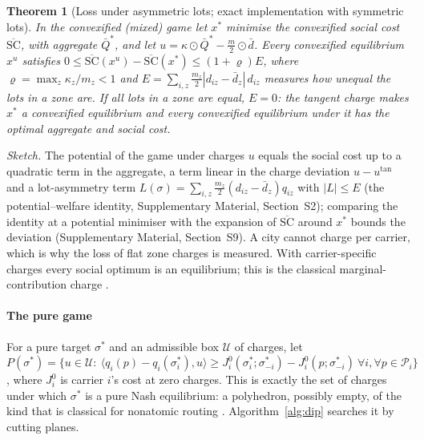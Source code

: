 \documentclass[preprint,11pt]{elsarticle}
\newtheorem{theorem}{Theorem}
\theoremstyle{definition}
\theoremstyle{remark}
\newcommand{\ip}[2]{\langle #1,#2\rangle}
\newcommand{\SM}[1]{Supplementary Material, Section~#1}
\begin{document}
\begin{theorem}[Loss under asymmetric lots; exact implementation with symmetric lots]\label{thm:asym}\label{thm:convex}
In the convexified (mixed) game let $x^*$ minimise the convexified social cost $\overline{\mathrm{SC}}$, with aggregate $\bar Q^*$, and let $u=\kappa\odot\bar Q^*-\tfrac m2\odot\bar d$. Every convexified equilibrium $x^u$ satisfies $0\le\overline{\mathrm{SC}}(x^u)-\overline{\mathrm{SC}}(x^*)\le(1+\varrho)E$, where $\varrho=\max_z\kappa_z/m_z<1$ and $E=\sum_{i,z}\tfrac{m_z}{2}|d_{iz}-\bar d_z|\,d_{iz}$ measures how unequal the lots in a zone are. If all lots in a zone are equal, $E=0$: the tangent charge makes $x^*$ a convexified equilibrium and every convexified equilibrium under it has the optimal aggregate and social cost.
\end{theorem}
\emph{Sketch.} The potential of the game under charges $u$ equals the social cost up to a quadratic term in the aggregate, a term linear in the charge deviation $u-u^{\tan}$ and a lot-asymmetry term $L(\sigma)=\sum_{i,z}\tfrac{m_z}{2}(d_{iz}-\bar d_z)q_{iz}$ with $|L|\le E$ (the potential--welfare identity, \SM{S2}); comparing the identity at a potential minimiser with the expansion of $\overline{\mathrm{SC}}$ around $x^*$ bounds the deviation (\SM{S9}). A city cannot charge per carrier, which is why the loss of flat zone charges is measured. With carrier-specific charges every social optimum is an equilibrium; this is the classical marginal-contribution charge \citep{Wolpert2001,Marden2013}.

\paragraph{The pure game} For a pure target $\sigma^*$ and an admissible box $\mathcal U$ of charges, let $P(\sigma^*)=\{u\in\mathcal U:\ \ip{q_i(p)-q_i(\sigma^*_i)}{u}\ge J^0_i(\sigma^*_i;\sigma^*_{-i})-J^0_i(p;\sigma^*_{-i})\ \forall i,\forall p\in\mathcal P_i\}$, where $J^0_i$ is carrier $i$'s cost at zero charges. This is exactly the set of charges under which $\sigma^*$ is a pure Nash equilibrium: a polyhedron, possibly empty, of the kind that is classical for nonatomic routing \citep{Bergendorff1997,Ahuja2001}. Algorithm~\ref{alg:dip} searches it by cutting planes.
\end{document}
